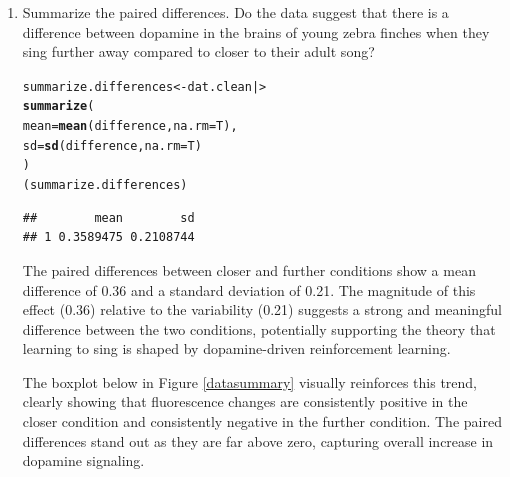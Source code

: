 \documentclass{article}\usepackage[]{graphicx}\usepackage[]{xcolor}
\makeatletter
\newcommand{\hldef}[1]{\textcolor[rgb]{0.345,0.345,0.345}{#1}}%
\newcommand{\hlkwb}[1]{\textcolor[rgb]{0.69,0.353,0.396}{#1}}%
\newcommand{\hlkwc}[1]{\textcolor[rgb]{0.333,0.667,0.333}{#1}}%
\newcommand{\hlkwd}[1]{\textcolor[rgb]{0.737,0.353,0.396}{\textbf{#1}}}%
\newenvironment{kframe}{%
 \def\at@end@of@kframe{}%
 \ifinner\ifhmode%
  \def\at@end@of@kframe{\end{minipage}}%
  \begin{minipage}{\columnwidth}%
 \fi\fi%
 \def\FrameCommand##1{\hskip\@totalleftmargin \hskip-\fboxsep
 \colorbox{shadecolor}{##1}\hskip-\fboxsep
     \hskip-\linewidth \hskip-\@totalleftmargin \hskip\columnwidth}%
 \MakeFramed {\advance\hsize-\width
   \@totalleftmargin\z@ \linewidth\hsize
   \@setminipage}}%
 {\par\unskip\endMakeFramed%
 \at@end@of@kframe}
\newenvironment{knitrout}{}{} %
\makeatother
\begin{document}
\begin{enumerate}
\begin{enumerate}
  \item Summarize the paired differences. Do the data suggest
  that there is a difference between dopamine in the brains of
  young zebra finches when they sing further away compared to 
  closer to their adult song?
  
\begin{knitrout}\scriptsize
{}\color{fgcolor}\begin{kframe}
\begin{alltt}
\hldef{summarize.differences} \hlkwb{<-} \hldef{dat.clean |>}
  \hlkwd{summarize}\hldef{(}
    \hlkwc{mean} \hldef{=} \hlkwd{mean}\hldef{(difference,} \hlkwc{na.rm}\hldef{=T),}
    \hlkwc{sd} \hldef{=} \hlkwd{sd}\hldef{(difference,} \hlkwc{na.rm}\hldef{=T)}
  \hldef{)}
\hldef{(summarize.differences)}
\end{alltt}
\begin{verbatim}
##        mean        sd
## 1 0.3589475 0.2108744
\end{verbatim}
\end{kframe}
\end{knitrout}

  The paired differences between closer and further conditions show a mean
  difference of 0.36 and a standard deviation of 0.21. The magnitude of this 
  effect (0.36) relative to the variability (0.21) suggests a strong and meaningful
  difference between the two conditions, potentially supporting the theory that
  learning to sing is shaped by dopamine-driven reinforcement learning.
  
  The boxplot below in Figure \ref{datasummary} visually reinforces this trend, clearly showing that
  fluorescence changes are consistently positive in the closer condition and consistently negative in
  the further condition. The paired differences stand out as they are far above zero, capturing overall
  increase in dopamine signaling. 


\end{enumerate}
\end{enumerate}
\end{document}
